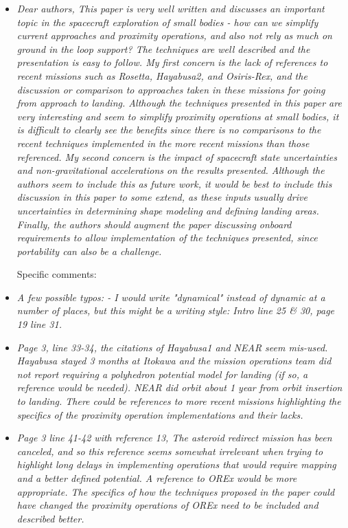 \documentclass[11pt]{article}
\newcommand{\comment}[1]{\item \itshape #1 \normalfont}
\begin{document}
\begin{itemize}\setlength{\itemsep}{2\parsep}

\comment{    Dear authors,
This paper is very well written and discusses an important topic in the spacecraft exploration of small bodies - how can we simplify current approaches and proximity operations, and also not rely as much on ground in the loop support? The techniques are well described and the presentation is easy to follow.
My first concern is the lack of references to recent missions such as Rosetta, Hayabusa2, and Osiris-Rex, and the discussion or comparison to approaches taken in these missions for going from approach to landing. Although the techniques presented in this paper are very interesting and seem to simplify proximity operations at small bodies, it is difficult to clearly see the benefits since there is no comparisons to the recent techniques implemented in the more recent missions than those referenced.
My second concern is the impact of spacecraft state uncertainties and non-gravitational accelerations on the results presented. Although the authors seem to include this as future work, it would be best to include this discussion in this paper to some extend, as these inputs usually drive uncertainties in determining shape modeling and defining landing areas.  
Finally, the authors should augment the paper discussing onboard requirements to allow implementation of the techniques presented, since portability can also be a challenge.

Specific comments:
}

\comment{A few possible typos:
- I would write "dynamical" instead of dynamic at a number of places, but this might be a writing style: Intro line 25 \& 30, page 19 line 31.
}

\comment{
Page 3, line 33-34, the citations of Hayabusa1 and NEAR seem mis-used. Hayabusa stayed 3 months at Itokawa and the mission operations team did not report requiring a polyhedron potential model for landing (if so, a reference would be needed). NEAR did orbit about 1 year from orbit insertion to landing.
There could be references to more recent missions highlighting the specifics of the proximity operation implementations and their lacks.
}

\comment{
Page 3 line 41-42 with reference 13, The asteroid redirect mission has been canceled, and so this reference seems somewhat irrelevant when trying to highlight long delays in implementing operations that would require mapping and a better defined potential. A reference to OREx would be more appropriate. The specifics of how the techniques proposed in the paper could have changed the proximity operations of OREx need to be included and described better.
}


\end{itemize}
\end{document}
